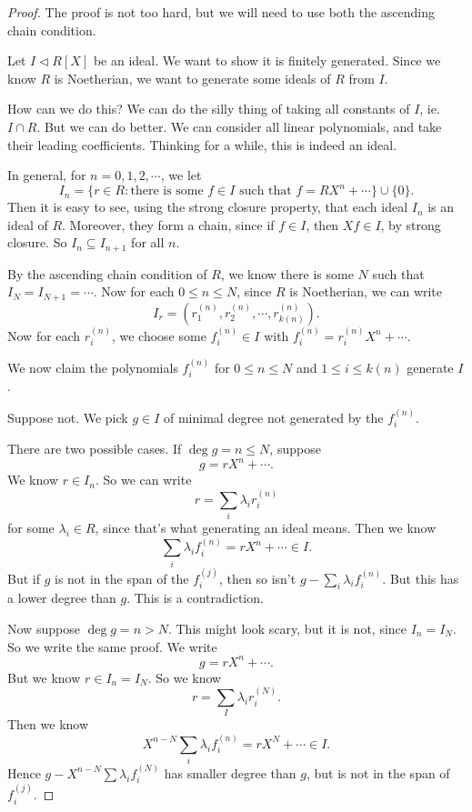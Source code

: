 \documentclass[a4paper]{article}
\begin{document}
\begin{proof}
  The proof is not too hard, but we will need to use both the ascending chain condition.

  Let $I \lhd R[X]$ be an ideal. We want to show it is finitely generated. Since we know $R$ is Noetherian, we want to generate some ideals of $R$ from $I$.

  How can we do this? We can do the silly thing of taking all constants of $I$, ie. $I \cap R$. But we can do better. We can consider all linear polynomials, and take their leading coefficients. Thinking for a while, this is indeed an ideal.

  In general, for $n = 0, 1, 2, \cdots$, we let
  \[
    I_n = \{r \in R: \text{there is some }f \in I\text{ such that }f = R X^n + \cdots\} \cup \{0\}.
  \]
  Then it is easy to see, using the strong closure property, that each ideal $I_n$ is an ideal of $R$. Moreover, they form a chain, since if $f \in I$, then $Xf \in I$, by strong closure. So $I_n \subseteq I_{n + 1}$ for all $n$.

  By the ascending chain condition of $R$, we know there is some $N$ such that $I_N = I_{N + 1} = \cdots$. Now for each $0 \leq n \leq N$, since $R$ is Noetherian, we can write
  \[
    I_r = (r_1^{(n)}, r_2^{(n)}, \cdots, r^{(n)}_{k(n)}).
  \]
  Now for each $r_i^{(n)}$, we choose some $f_i^{(n)} \in I$ with $f^{(n)}_i = r_i^{(n)} X^n + \cdots$.

  We now claim the polynomials $f_i^{(n)}$ for $0 \leq n \leq N$ and $1 \leq i \leq k(n)$ generate $I$.

  Suppose not. We pick $g \in I$ of minimal degree not generated by the $f_i^{(n)}$.

  There are two possible cases. If $\deg g = n \leq N$, suppose
  \[
    g = rX^n + \cdots.
  \]
  We know $r \in I_n$. So we can write
  \[
    r = \sum_i \lambda_i r^{(n)}_i
  \]
  for some $\lambda_i \in R$, since that's what generating an ideal means. Then we know
  \[
    \sum_i \lambda_i f_i^{(n)} = r X^n + \cdots \in I.
  \]
  But if $g$ is not in the span of the $f_i^{(j)}$, then so isn't $g - \sum_i \lambda_i f_i^{(n)}$. But this has a lower degree than $g$. This is a contradiction.

  Now suppose $\deg g = n > N$. This might look scary, but it is not, since $I_n = I_N$. So we write the same proof. We write
  \[
    g = r X^n + \cdots.
  \]
  But we know $r \in I_n = I_N$. So we know
  \[
    r = \sum_I \lambda_i r_i^{(N)}.
  \]
  Then we know
  \[
    X^{n - N}\sum_i \lambda_i f_i^{(n)} = r X^N + \cdots \in I.
  \]
  Hence $g - X^{n - N} \sum \lambda_i f^{(N)}_i$ has smaller degree than $g$, but is not in the span of $f_i^{(j)}$.
\end{proof}
\end{document}
